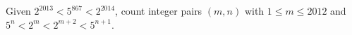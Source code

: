 Given $2^{2013}<5^{867}<2^{2014}$, count integer pairs $(m,n)$ with $1\le m\le2012$ and $5^n<2^m<2^{m+2}<5^{n+1}$.

